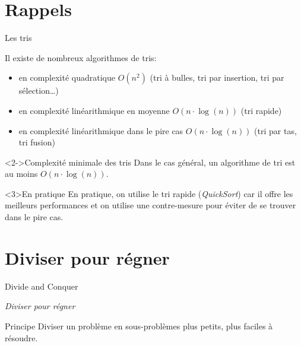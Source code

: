
\date[14 fév. 2022]{Lundi 14 février 2022}
\subtitle{Diviser pour régner}
\maketitle

\section{Rappels}

\begin{frame}{Les tris}

Il existe de nombreux algorithmes de tris:
\begin{itemize}
  \item en complexité quadratique $O(n^2)$ (tri à bulles, tri par insertion, tri par sélection\dots)
  \item en complexité linéarithmique en moyenne $O(n\cdot \log(n))$ (tri rapide)
  \item en complexité linéarithmique dans le pire cas $O(n\cdot \log(n))$ (tri par tas, tri fusion)
\end{itemize}

\begin{block}<2->{Complexité minimale des tris}
Dans le cas général, un algorithme de tri est au moins $O(n\cdot \log(n))$.
\end{block}

\begin{exampleblock}<3>{En pratique}
En pratique, on utilise le tri rapide (\textit{QuickSort}) car il offre les meilleurs performances et on utilise une contre-mesure pour éviter de se trouver dans le pire cas.
\end{exampleblock}
\end{frame}

\section{Diviser pour régner}

\begin{frame}{Divide and Conquer}
\begin{center}
\textit{Diviser pour régner} 
\end{center}

\begin{block}{Principe}
Diviser un problème en sous-problèmes plus petits, plus faciles à résoudre.
\end{block}

\end{frame}

